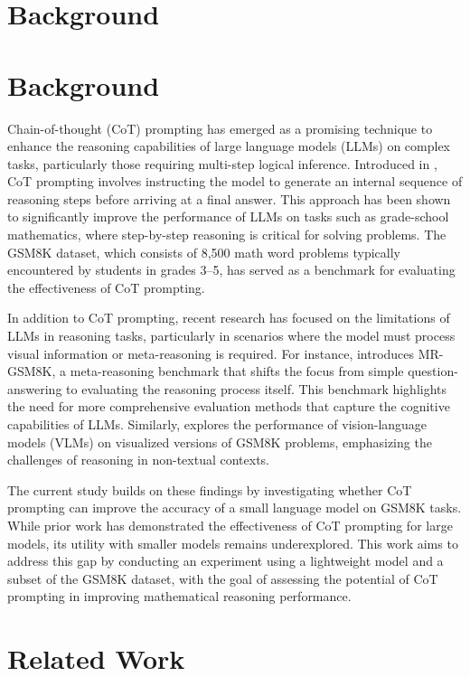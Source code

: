 \documentclass{article}
\begin{document}
\section{Background}
\section*{Background}

Chain-of-thought (CoT) prompting has emerged as a promising technique to enhance the reasoning capabilities of large language models (LLMs) on complex tasks, particularly those requiring multi-step logical inference. Introduced in \cite{2201.11903v6}, CoT prompting involves instructing the model to generate an internal sequence of reasoning steps before arriving at a final answer. This approach has been shown to significantly improve the performance of LLMs on tasks such as grade-school mathematics, where step-by-step reasoning is critical for solving problems. The GSM8K dataset, which consists of 8,500 math word problems typically encountered by students in grades 3–5, has served as a benchmark for evaluating the effectiveness of CoT prompting. 

In addition to CoT prompting, recent research has focused on the limitations of LLMs in reasoning tasks, particularly in scenarios where the model must process visual information or meta-reasoning is required. For instance, \cite{2312.17080v4} introduces MR-GSM8K, a meta-reasoning benchmark that shifts the focus from simple question-answering to evaluating the reasoning process itself. This benchmark highlights the need for more comprehensive evaluation methods that capture the cognitive capabilities of LLMs. Similarly, \cite{2509.25160v3} explores the performance of vision-language models (VLMs) on visualized versions of GSM8K problems, emphasizing the challenges of reasoning in non-textual contexts. 

The current study builds on these findings by investigating whether CoT prompting can improve the accuracy of a small language model on GSM8K tasks. While prior work has demonstrated the effectiveness of CoT prompting for large models, its utility with smaller models remains underexplored. This work aims to address this gap by conducting an experiment using a lightweight model and a subset of the GSM8K dataset, with the goal of assessing the potential of CoT prompting in improving mathematical reasoning performance.
\section{Related Work}
\end{document}
